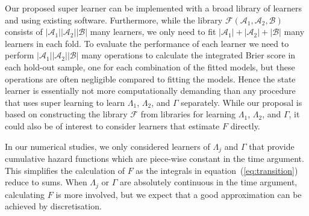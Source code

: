 \documentclass[numsec,webpdf,contemporary,medium,namedate]{oup-authoring-template}%
\theoremstyle{thmstyleone}%
\theoremstyle{thmstyletwo}%
\theoremstyle{thmstylethree}%
\newcommand{\1}{\mathds{1}}
\begin{document}
Our proposed super learner can be implemented with a broad library of learners
and using existing software.
Furthermore, while
the library \( \mathcal{F}(\mathcal{A}_1,\mathcal{A}_2,\mathcal{B}) \) consists
of \( |\mathcal{A}_1||\mathcal{A}_2||\mathcal{B}| \) many learners, we only need to fit
\( |\mathcal{A}_1| +|\mathcal{A}_2| + |\mathcal{B}| \) many learners in each fold. To
evaluate the performance of each learner we need to perform
\( |\mathcal{A}_1||\mathcal{A}_2||\mathcal{B}| \) many operations to calculate the
integrated Brier score in each hold-out sample, one for each combination of the
fitted models, but these operations are often negligible compared to fitting the
models. Hence the state learner is essentially not more computationally demanding
than any procedure that uses super learning to learn $\Lambda_1$, $\Lambda_2$,
and $\Gamma$ separately. While our proposal is based on constructing the library
\( \mathcal{F} \) from libraries for learning \( \Lambda_1 \), $\Lambda_2$, and
$\Gamma$, it could also be of interest to consider learners that estimate
\( F \) directly.

In our numerical studies, we only considered learners of $\Lambda_j$ and
$\Gamma$ that provide cumulative hazard functions which are piece-wise constant
in the time argument. This simplifies the calculation of \( F \) as the
integrals in equation~(\ref{eq:transition}) reduce to sums. When $\Lambda_j$ or
\( \Gamma \) are absolutely continuous in the time argument, calculating \( F \)
is more involved, but we expect that a good approximation can be achieved by
discretisation. 
\end{document}
